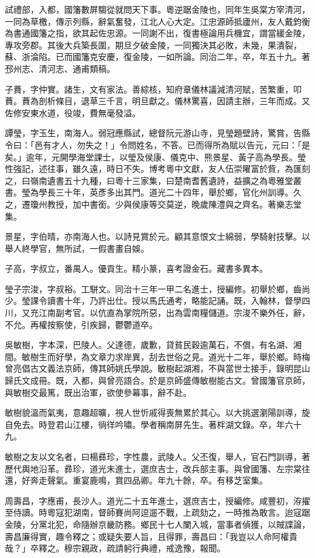 \begin{pinyinscope}
試禮部，入都，國籓數屏騶從就問天下事。粵逆踞金陵也，同年生吳棠方宰清河，一同為草檄，傳示列縣，辭氣奮發，江北人心大定。江忠源師抵廬州，友人戴鈞衡為書通國籓之指，欲其起佐忠源。一同謝不出，復書極論用兵機宜，謂當緩金陵，專攻旁郡。其後大兵築長圍，期旦夕破金陵，一同獨決其必敗，未幾，果潰裂，蘇、浙淪陷。已而國籓克安慶，復金陵，一如所論。同治二年，卒，年五十九。著邳州志、清河志、通甫類稿。

子蕡，字仲實。諸生，文有家法。善綜核，知府章儀林議減清河賦，苦繁重，叩蕡。蕡為剖析條目，退草三千言，明旦獻之。儀林驚喜，因請主辦，三年而成。又佐修安東水道，役竣，費無毫發溢。

譚瑩，字玉生，南海人。弱冠應縣試，總督阮元游山寺，見瑩題壁詩，驚賞，告縣令曰：「邑有才人，勿失之！」令問姓名，不答。已而得所為賦以告元，元曰：「是矣。」逾年，元開學海堂課士，以瑩及侯康、儀克中、熊景星、黃子高為學長。瑩性強記，述往事，雖久遠，時日不失。博考粵中文獻，友人伍崇曜富於貲，為匯刻之，曰嶺南遺書五十九種，曰粵十三家集，曰楚南耆舊遺詩，益擴之為粵雅堂叢書。瑩為學長三十年，英彥多出其門。道光二十四年，舉於鄉，官化州訓導。久之，遷瓊州教授，加中書銜。少與侯康等交莫逆，晚歲陳澧與之齊名。著樂志堂集。

景星，字伯晴，亦南海人也。以詩見賞於元。顧其意恨文士綿弱，學騎射技擊。以舉人終學官，無所試，一假書畫自娛。

子高，字叔立，番禺人。優貢生。精小篆，喜考證金石。藏書多異本。

瑩子宗浚，字叔裕。工駢文。同治十三年一甲二名進士，授編修。初舉於鄉，齒尚少。瑩課令讀書十年，乃許出仕。授以馬氏通考，略能記誦。既，入翰林，督學四川，又充江南副考官。以伉直為掌院所惡，出為雲南糧儲道。宗浚不樂外任，辭，不允。再權按察使，引疾歸，鬱鬱道卒。

吳敏樹，字本深，巴陵人。父達德，歲歉，貸貧民穀逾萬石，不償，有名湖、湘間。敏樹生而好學，為文章力求岸異，刮去世俗之見。道光十二年，舉於鄉。時梅曾亮倡古文義法京師，傳其師姚氏學說。敏樹起湖湘，不與當世士接手，錄明昆山歸氏文成冊。既，入都，與曾亮語合。於是京師盛傳敏樹能古文。曾國籓官京師，與敏樹交最篤，既出治軍，欲使參幕事，辭不赴。

敏樹貌溫而氣夷，意趣超曠，視人世忻戚得喪無累於其心。以大挑選瀏陽訓導，旋自免去。時登君山江樓，徜徉吟嘯。學者稱南屏先生。著柈湖文錄。卒，年六十九。

敏樹之友以文名者，曰楊彞珍，字性農，武陵人。父丕復，舉人，官石門訓導，著歷代輿地沿革。彞珍，道光末進士，選庶吉士，改兵部主事。與曾國籓、左宗棠往還，好奔走聲氣。重宴鹿鳴，賞四品卿。年九十餘，卒。有移芝室集。

周壽昌，字應甫，長沙人。道光二十五年進士，選庶吉士，授編修。咸豐初，洊擢至侍讀。時粵寇犯湖南，督師賽尚阿逗遛不戰，上疏劾之，一時推為敢言。迨寇踞金陵，分黨北犯，命隨辦京畿防務。鄉民十七人闌入城，當事者偵獲，以賊諜論，壽昌廉得實，趣令釋之；或疑失要人旨，且得罪，壽昌曰：「我豈以人命阿權貴哉？」卒釋之。穆宗親政，疏請躬行典禮，戒逸豫，報聞。


\end{pinyinscope}
